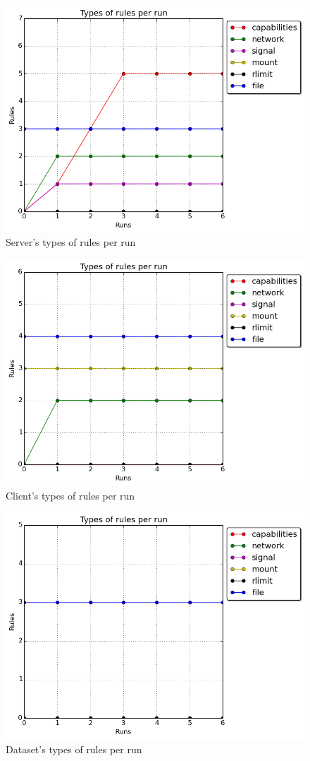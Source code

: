 \begin{figure}[h!]
  \centering
   \includegraphics[width=0.64\linewidth]{./figures/mediastreaming/plots_with_grid/types_cloudsuitemedia-streamingserver.png}
   \caption{Server's types of rules per run}
\end{figure}

\begin{figure}[h!]
  \centering
   \includegraphics[width=0.64\linewidth]{./figures/mediastreaming/plots_with_grid/types_cloudsuitemedia-streamingclient.png}
   \caption{Client's types of rules per run}
\end{figure}

\begin{figure}[h!]
  \centering
   \includegraphics[width=0.64\linewidth]{./figures/mediastreaming/plots_with_grid/types_cloudsuitemedia-streamingdataset.png}
   \caption{Dataset's types of rules per run}
\end{figure}
